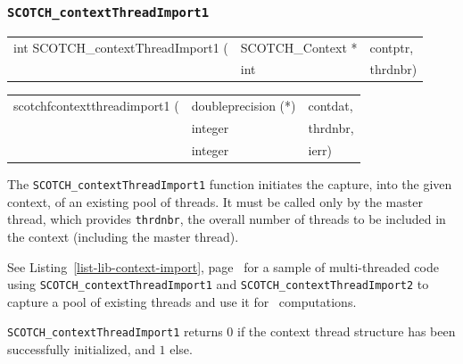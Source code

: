 \subsubsection{\texttt{SCOTCH\_contextThreadImport1}}

\begin{itemize}
\progsyn

{\tt\begin{tabular}{l@{}ll}
int SCOTCH\_contextThreadImport1 ( & SCOTCH\_Context * & contptr, \\
                                   & int               & thrdnbr)
\end{tabular}}

{\tt\begin{tabular}{l@{}ll}
scotchfcontextthreadimport1 ( & doubleprecision (*) & contdat, \\
                              & integer             & thrdnbr, \\
                              & integer             & ierr)
\end{tabular}}

\progdes

The \texttt{SCOTCH\_contextThreadImport1} function initiates the
capture, into the given context, of an existing pool of threads. It
must be called only by the master thread, which provides
\texttt{thrdnbr}, the overall number of threads to be included in the
context (including the master thread).

See Listing~\ref{list-lib-context-import},
page~\pageref{list-lib-context-import} for a sample of multi-threaded
code using \texttt{SCOTCH\_\lbt context\lbt Thread\lbt Import1} and
\texttt{SCOTCH\_\lbt context\lbt Thread\lbt Import2} to capture a pool
of existing threads and use it for \libscotch\ computations.

\progret

\texttt{SCOTCH\_contextThreadImport1} returns $0$ if the context
thread structure has been successfully initialized, and $1$ else.
\end{itemize}

